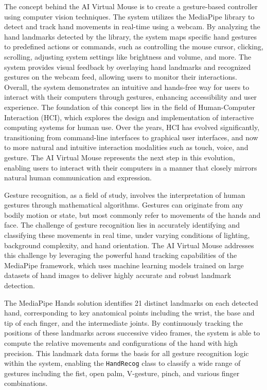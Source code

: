 \documentclass[12pt,a4paper]{report}
\begin{document}
The concept behind the AI Virtual Mouse is to create a gesture-based controller using
computer vision techniques. The system utilizes the MediaPipe library to detect and track
hand movements in real-time using a webcam. By analyzing the hand landmarks detected by the
library, the system maps specific hand gestures to predefined actions or commands, such as
controlling the mouse cursor, clicking, scrolling, adjusting system settings like brightness
and volume, and more. The system provides visual feedback by overlaying hand landmarks and
recognized gestures on the webcam feed, allowing users to monitor their interactions. Overall,
the system demonstrates an intuitive and hands-free way for users to interact with their
computers through gestures, enhancing accessibility and user experience.
The foundation of this concept lies in the field of Human-Computer Interaction (HCI),
which explores the design and implementation of interactive computing systems for human
use. Over the years, HCI has evolved significantly, transitioning from command-line
interfaces to graphical user interfaces, and now to more natural and intuitive interaction
modalities such as touch, voice, and gesture. The AI Virtual Mouse represents the next
step in this evolution, enabling users to interact with their computers in a manner that
closely mirrors natural human communication and expression.

Gesture recognition, as a field of study, involves the interpretation of human gestures
through mathematical algorithms. Gestures can originate from any bodily motion or state,
but most commonly refer to movements of the hands and face. The challenge of gesture
recognition lies in accurately identifying and classifying these movements in real time,
under varying conditions of lighting, background complexity, and hand orientation. The
AI Virtual Mouse addresses this challenge by leveraging the powerful hand tracking
capabilities of the MediaPipe framework, which uses machine learning models trained on
large datasets of hand images to deliver highly accurate and robust landmark detection.

The MediaPipe Hands solution identifies 21 distinct landmarks on each detected hand,
corresponding to key anatomical points including the wrist, the base and tip of each
finger, and the intermediate joints. By continuously tracking the positions of these
landmarks across successive video frames, the system is able to compute the relative
movements and configurations of the hand with high precision. This landmark data forms
the basis for all gesture recognition logic within the system, enabling the
\texttt{HandRecog} class to classify a wide range of gestures including the fist,
open palm, V-gesture, pinch, and various finger combinations.
\end{document}
